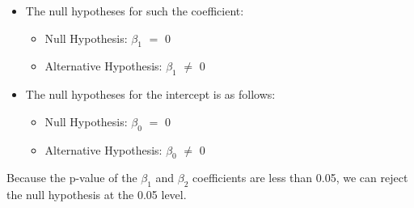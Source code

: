 \documentclass[12pt,letterpaper]{article}
\begin{document}
\begin{enumerate}
\begin{itemize}
	\item  The null hypotheses for such the coefficient:
	\begin{itemize}
		\item {Null Hypothesis: $\beta_1$ $=$ 0}
		\item {Alternative Hypothesis: $\beta_1$ $\neq$ 0}
	\end{itemize}
	
	\item The null hypotheses for the intercept is as follows:
	\begin{itemize}
		\item {Null Hypothesis: $\beta_0$ $=$ 0}
		\item {Alternative Hypothesis: $\beta_0$ $\neq$ 0}
	\end{itemize}
	
\end{itemize}

\begin{flushleft}Because the p-value of the $\beta_1$ and $\beta_2$ coefficients are less than 0.05, we can reject the null hypothesis at the 0.05 level.
\end{flushleft}

	\end{enumerate}
\end{document}
